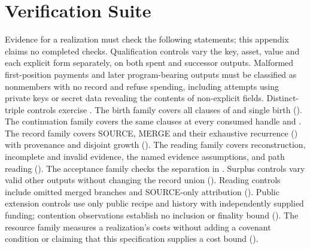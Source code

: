 \documentclass[../main.tex]{subfiles}
\begin{document}
\section{Verification Suite}
\label{app:kpcfixed-verification:suite}
Evidence for a realization must check the following statements; this appendix claims
no completed checks. Qualification controls vary the key, asset, value
and each explicit form separately, on both spent and successor outputs.
Malformed first-position payments and later program-bearing outputs
must be classified as nonmembers with no record and refuse spending,
including attempts using private keys or secret data revealing the contents
of non-explicit fields. Distinct-triple controls exercise
.
The birth family covers all clauses of
 and single birth
(). The continuation family covers the
same clauses at every consumed handle and
.
The record family covers SOURCE, MERGE and their exhaustive recurrence
()
with provenance and disjoint growth
().
The reading family covers reconstruction, incomplete and invalid evidence,
the named evidence assumptions, and path reading
().
The acceptance family checks the separation in
.
Surplus controls vary valid other outputs without changing the record
union (). Reading controls
include omitted merged branches and SOURCE-only attribution
().
Public extension controls use only public recipe and history
with independently supplied funding; contention observations establish no
inclusion or finality bound ().
The resource family measures a realization's costs without adding a
covenant condition or claiming that this specification supplies a cost
bound ().
\end{document}
